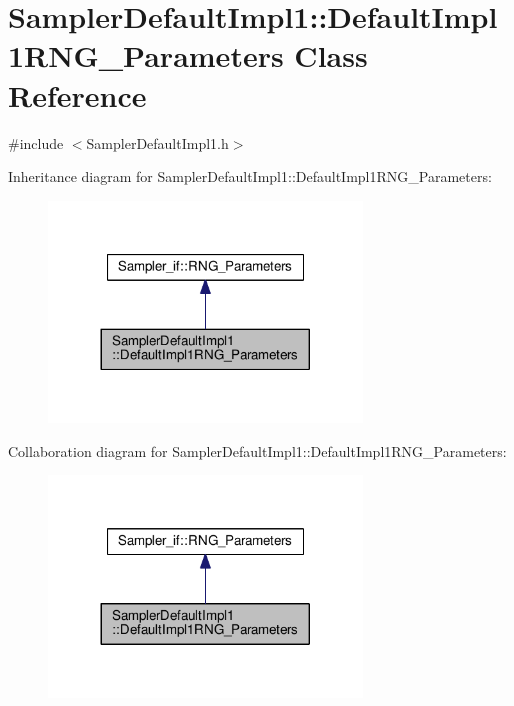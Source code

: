 \hypertarget{class_sampler_default_impl1_1_1_default_impl1_r_n_g___parameters}{}\section{Sampler\+Default\+Impl1\+:\+:Default\+Impl1\+R\+N\+G\+\_\+\+Parameters Class Reference}
\label{class_sampler_default_impl1_1_1_default_impl1_r_n_g___parameters}


{\ttfamily \#include $<$Sampler\+Default\+Impl1.\+h$>$}



Inheritance diagram for Sampler\+Default\+Impl1\+:\+:Default\+Impl1\+R\+N\+G\+\_\+\+Parameters\+:\nopagebreak
\begin{figure}[H]
\begin{center}
\leavevmode
\includegraphics[width=236pt]{class_sampler_default_impl1_1_1_default_impl1_r_n_g___parameters__inherit__graph}
\end{center}
\end{figure}


Collaboration diagram for Sampler\+Default\+Impl1\+:\+:Default\+Impl1\+R\+N\+G\+\_\+\+Parameters\+:\nopagebreak
\begin{figure}[H]
\begin{center}
\leavevmode
\includegraphics[width=236pt]{class_sampler_default_impl1_1_1_default_impl1_r_n_g___parameters__coll__graph}
\end{center}
\end{figure}

